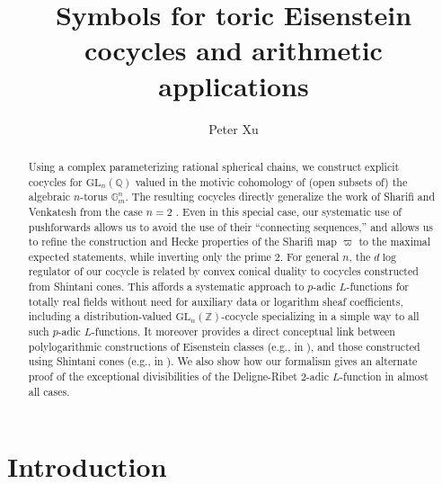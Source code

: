 \documentclass[10pt]{amsart}
\title{Symbols for toric Eisenstein cocycles and arithmetic applications}
\author{Peter Xu}
\theoremstyle{definition}
\newcommand{\Z}{\mathbb{Z}}
\newcommand{\Q}{\mathbb{Q}}
\newcommand{\GL}{\mathrm{GL}}
\numberwithin{equation}{section}
\begin{document}
        \makeatletter
\@setabstract
\makeatother
\maketitle

\begin{abstract}
    Using a complex parameterizing rational spherical chains, we construct explicit cocycles for $\mathrm{GL}_n(\Q)$ valued in the motivic cohomology of (open subsets of) the algebraic $n$-torus $\mathbb{G}_m^n$. The resulting cocycles directly generalize the work of Sharifi and Venkatesh from the case $n=2$ \cite{SV}. Even in this special case, our systematic use of pushforwards allows us to avoid the use of their ``connecting sequences,'' and allows us to refine the construction and Hecke properties of the Sharifi map $\varpi$ to the maximal expected statements, while inverting only the prime $2$. For general $n$, the $d\log$ regulator of our cocycle is related by convex conical duality to cocycles constructed from Shintani cones. This affords a systematic approach to $p$-adic $L$-functions for totally real fields without need for auxiliary data or logarithm sheaf coefficients, including a distribution-valued $\GL_n(\Z)$-cocycle specializing in a simple way to all such $p$-adic $L$-functions. It moreover provides a direct conceptual link between polylogarithmic constructions of Eisenstein classes (e.g., in \cite{BKL}), and those constructed using Shintani cones (e.g., in \cite{CDG}). We also show how our formalism gives an alternate proof of the exceptional divisibilities of the Deligne-Ribet $2$-adic $L$-function in almost all cases.
\end{abstract}

\tableofcontents

    \section{Introduction}
\end{document}
